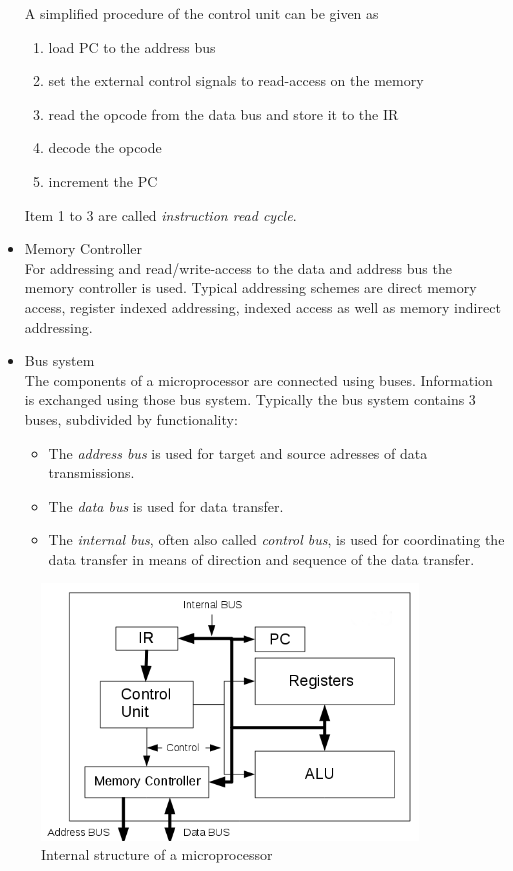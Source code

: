 \begin{itemize}
A simplified procedure of the control unit can be given as
\begin{enumerate}
\item load PC to the address bus
\item set the external control signals to read-access on the memory
\item read the opcode from the data bus and store it to the IR
\item decode the opcode
\item increment the PC
\end{enumerate}
Item 1 to 3 are called \textit{instruction read cycle}.
\item Memory Controller\\
For addressing and read/write-access to the data and address bus the memory controller is used. Typical addressing schemes are direct memory access, register indexed addressing, indexed access as well as memory indirect addressing.
\item Bus system\\
The components of a microprocessor are connected using buses. Information is exchanged using those bus system. Typically the bus system contains 3 buses, subdivided by functionality:\cite{Bei04}
\begin{itemize}
\item The \textit{address bus} is used for target and source adresses of data transmissions.
\item The \textit{data bus} is used for data transfer.
\item The \textit{internal bus}, often also called \textit{control bus}, is used for coordinating the data transfer in means of direction and sequence of the data transfer.
\end{itemize}
\end{itemize}
\begin{figure}[htbp]
\begin{center}
\includegraphics[width=10cm,keepaspectratio=true]{bilder/png/microprocessorblockdiagram}
\caption{Internal structure of a microprocessor}
\label{fig:microprocessorblockdiagram}
\end{center}
\end{figure}
